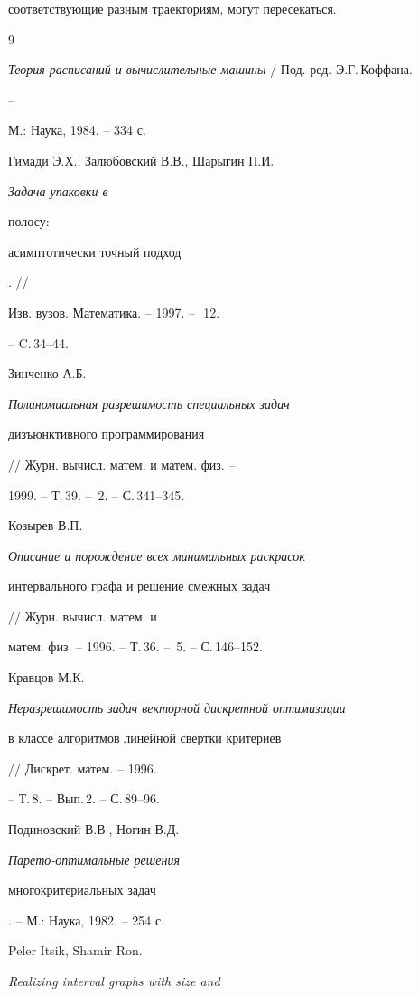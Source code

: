 соответствующие разным траекториям, могут пересекаться. 


 


 


\begin{thebibliography}{9} 


 




{\em Теория расписаний и вычислительные машины} / Под. ред. Э.Г.\,Коффана. 


-- 


М.: Наука, 1984. -- 334 с. 




Гимади Э.Х., Залюбовский В.В., Шарыгин П.И. {\em Задача упаковки в 


полосу$:$ 


асимптотически точный подход}. // 


Изв. вузов. Математика. -- 1997. -- \No\,\,12. 


-- C.\,34--44. 




Зинченко А.Б. {\em Полиномиальная разрешимость специальных задач 


дизъюнктивного программирования} // Журн. вычисл. матем. и матем. физ. -- 


1999. -- Т.\,39. -- \No\,2. -- С.\,341--345. 




Козырев В.П. {\em Описание и порождение всех минимальных раскрасок 


интервального графа и решение смежных задач} // Журн. вычисл. матем. и 


матем. физ. -- 1996. -- Т.\,36. -- \No\,5. -- С.\,146--152. 




Кравцов М.К. {\em Неразрешимость задач векторной дискретной оптимизации 


в классе алгоритмов линейной свертки критериев} // Дискрет. матем. -- 1996.


-- Т.\,8. -- Вып.\,2. -- С.\,89--96. 




Подиновский В.В., Ногин В.Д. {\em Парето-оптимальные решения 


многокритериальных задач}. -- М.: Наука, 1982. -- 254 с. 




Peler Itsik, Shamir Ron. {\em Realizing interval graphs with size and


}
\end{thebibliography}
